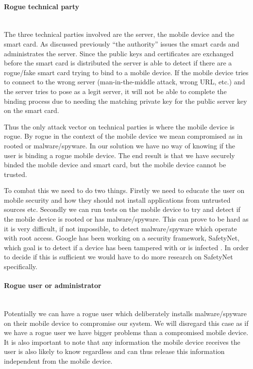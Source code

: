 \paragraph{Rogue technical party}\mbox{}\\
The three technical parties involved are the server, the mobile device and the smart card. As discussed previously ``the authority'' issues the smart cards and administrates the server. Since the public keys and certificates are exchanged before the smart card is distributed the server is able to detect if there are a rogue/fake smart card trying to bind to a mobile device. If the mobile device tries to connect to the wrong server (man-in-the-middle attack, wrong URL, etc.) and the server tries to pose as a legit server, it will not be able to complete the binding process due to needing the matching private key for the public server key on the smart card.

Thus the only attack vector on technical parties is where the mobile device is rogue. By rogue in the context of the mobile device we mean compromised as in rooted or malware/spyware. In our solution we have no way of knowing if the user is binding a rogue mobile device. The end result is that we have securely binded the mobile device and smart card, but the mobile device cannot be trusted.

To combat this we need to do two things. Firstly we need to educate the user on mobile security and how they should not install applications from untrusted sources etc. Secondly we can run tests on the mobile device to try and detect if the mobile device is rooted or has malware/spyware. This can prove to be hard as it is very difficult, if not impossible, to detect malware/spyware which operate with root access. Google has been working on a security framework, SafetyNet, which goal is to detect if a device has been tampered with or is infected \cite{googleSafetynet}. In order to decide if this is sufficient we would have to do more research on SafetyNet specifically.

\paragraph{Rogue user or administrator}\mbox{}\\
Potentially we can have a rogue user which deliberately installs malware/spyware on their mobile device to compromise our system. We will disregard this case as if we have a rogue user we have bigger problems than a compromised mobile device. It is also important to note that any information the mobile device receives the user is also likely to know regardless and can thus release this information independent from the mobile device.


